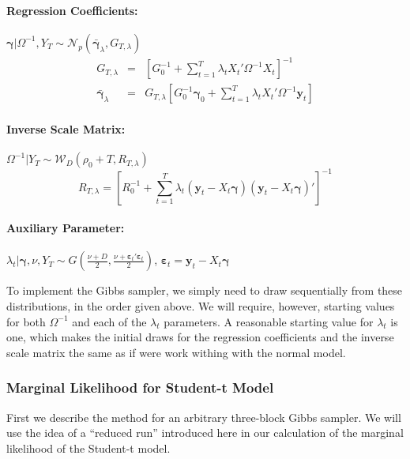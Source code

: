 \documentclass[12pt]{article}
\begin{document}
\paragraph{Regression Coefficients:} 
$\boldsymbol{\gamma}|\Omega^{-1},Y_T \sim \mathcal{N}_p\left( \bar{\boldsymbol{\gamma}}_{\lambda},G_{T,\lambda} \right)$
\begin{eqnarray*}
	G_{T,\lambda} &=& \left[ G_0^{-1} + \sum_{t=1}^T \lambda_t X_t' \Omega^{-1} X_t \right]^{-1}\\
	\bar{\boldsymbol{\gamma}}_{\lambda} &=& G_{T,\lambda} \left[ G_0^{-1}\boldsymbol{\gamma}_0 + \sum_{t=1}^{T}\lambda_t X_t'\Omega^{-1}\mathbf{y}_t \right]
\end{eqnarray*}
\paragraph{Inverse Scale Matrix:}
$\Omega^{-1}|Y_T \sim \mathcal{W}_D\left(\rho_0 + T, R_{T,\lambda}\right)$
\begin{equation*}
R_{T,\lambda} = \left[ R_0^{-1} + \sum_{t=1}^{T} \lambda_t\left( \mathbf{y}_t - X_t \boldsymbol{\gamma} \right)\left( \mathbf{y}_t - X_t \boldsymbol{\gamma} \right)' \right]^{-1}
\end{equation*}

\paragraph{Auxiliary Parameter:} $\lambda_t|\boldsymbol{\gamma}, \nu, Y_T \sim G\left(\displaystyle \frac{\nu + D}{2}, \frac{\nu + \boldsymbol{\varepsilon}_t' \boldsymbol{\varepsilon}_t}{2} \right)$, $\boldsymbol{\varepsilon}_t = \mathbf{y}_t - X_t \boldsymbol{\gamma}$

To implement the Gibbs sampler, we simply need to draw sequentially from these distributions, in the order given above. 
We will require, however, starting values for both $\Omega^{-1}$ and each of the $\lambda_t$ parameters. 
A reasonable starting value for $\lambda_t$ is one, which makes the initial draws for the regression coefficients and the inverse scale matrix the same as if were work withing with the normal model.

\subsubsection{Marginal Likelihood for Student-t Model}
First we describe the method for an arbitrary three-block Gibbs sampler. 
We will use the idea of a ``reduced run'' introduced here in our calculation of the marginal likelihood of the Student-t model.
\end{document}
